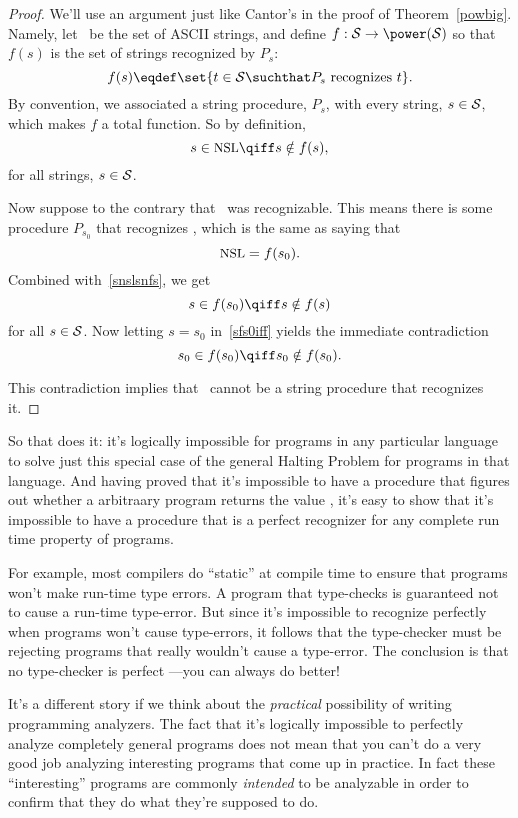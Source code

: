 \begin{proof}
We'll use an argument just like Cantor's in the proof of
Theorem~\ref{powbig}.  Namely, let \asciistr\ be the set of ASCII
strings, and define $f: \asciistr \to \power(\asciistr)$ so that $f(s)$ is the
set of strings recognized by $P_s$:
\[
f(s) \eqdef \set{t \in \asciistr \suchthat P_s \text{ recognizes } t}.
\]
By convention, we associated a string procedure, $P_s$, with every string,
$s \in \text{$\mathcal{S}$}$, which makes $f$ a total function.  So by
definition,
\begin{equation}\label{snslsnfs}
s \in \nsl \qiff s \notin f(s),
\end{equation}
for all strings, $s \in \text{$\mathcal{S}$}$.

Now suppose to the contrary that \nsl\ was recognizable.  This means
there is some procedure $P_{s_0}$ that recognizes \nsl, which is the
same as saying that
\[
\text{\small{NSL}} = f(s_0).
\]
Combined with~\eqref{snslsnfs}, we get
\begin{equation}\label{sfs0iff}
s \in f(s_0) \qiff s \notin f(s)
\end{equation}
for all $s \in \text{$\mathcal{S}$}$.  Now letting $s = s_0$ in~\eqref{sfs0iff}
yields the immediate contradiction
\[
s_0 \in f(s_0) \qiff s_0 \notin f(s_0).
\]

This contradiction implies that \nsl\ cannot be a string procedure that
recognizes it.

\end{proof}

So that does it: it's logically impossible for programs in any particular
language to solve just this special case of the general Halting Problem
for programs in that language.  And having proved that it's impossible to
have a procedure that figures out whether a arbitraary program returns the
value \True, it's easy to show that it's impossible to have a procedure
that is a perfect recognizer for any complete run time property of
programs.

For example, most compilers do ``static''  at compile
time to ensure that programs won't make run-time type errors.  A program
that type-checks is guaranteed not to cause a run-time type-error.  But
since it's impossible to recognize perfectly when programs won't cause
type-errors, it follows that the type-checker must be rejecting programs
that really wouldn't cause a type-error.  The conclusion is that no
type-checker is perfect ---you can always do better!

  It's a different story if we think about the \emph{practical}
  possibility of writing programming analyzers.  The fact that it's
  logically impossible to perfectly analyze completely general programs
  does not mean that you can't do a very good job analyzing interesting
  programs that come up in practice.  In fact these ``interesting''
  programs are commonly \emph{intended} to be analyzable in order to
  confirm that they do what they're supposed to do.

